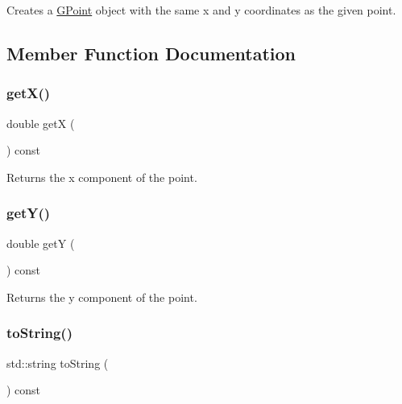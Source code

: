 Creates a {\ttfamily \mbox{\hyperlink{classGPoint}{G\+Point}}} object with the same {\ttfamily x} and {\ttfamily y} coordinates as the given point. 



\subsection{Member Function Documentation}
\mbox{\label{classGPoint_a344385751bee0720059403940d57a13e}} 
\subsubsection{\texorpdfstring{get\+X()}{getX()}}
{\footnotesize\ttfamily double getX (\begin{DoxyParamCaption}{ }\end{DoxyParamCaption}) const}



Returns the x component of the point. 

\mbox{\label{classGPoint_aafa51c7f8f38a09febbb9ce7853f77b4}} 
\subsubsection{\texorpdfstring{get\+Y()}{getY()}}
{\footnotesize\ttfamily double getY (\begin{DoxyParamCaption}{ }\end{DoxyParamCaption}) const}



Returns the y component of the point. 

\mbox{\label{classGPoint_a1fe5121d6528fdea3f243321b3fa3a49}} 
\subsubsection{\texorpdfstring{to\+String()}{toString()}}
{\footnotesize\ttfamily std\+::string to\+String (\begin{DoxyParamCaption}{ }\end{DoxyParamCaption}) const}



